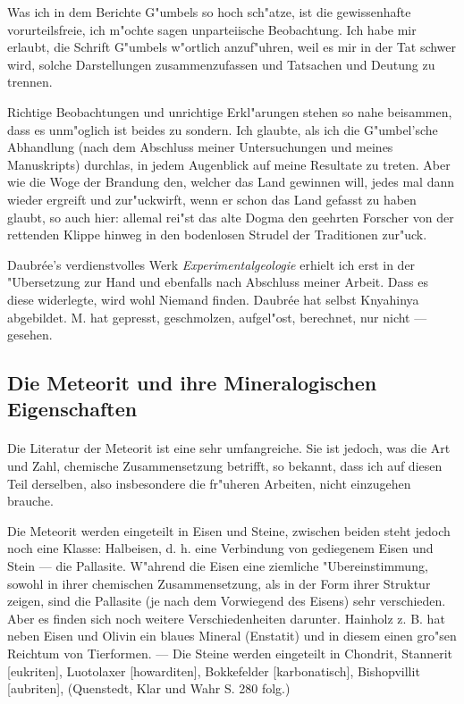\documentclass[a4paper, 11pt, oneside]{article}
\begin{document}
Was ich in dem Berichte G"umbels so hoch sch"atze, ist die gewissenhafte vorurteilsfreie, ich m"ochte sagen unparteiische Beobachtung. Ich habe mir erlaubt, die Schrift G"umbels w"ortlich anzuf"uhren, weil es mir in der Tat schwer wird, solche Darstellungen zusammenzufassen und Tatsachen und Deutung zu trennen.

Richtige Beobachtungen und unrichtige Erkl"arungen stehen so nahe beisammen, dass es unm"oglich ist beides zu sondern. Ich glaubte, als ich die G"umbel'sche Abhandlung (nach dem Abschluss meiner Untersuchungen und meines Manuskripts) durchlas, in jedem Augenblick auf meine Resultate zu treten. Aber wie die Woge der Brandung den, welcher das Land gewinnen will, jedes mal dann wieder ergreift und zur"uckwirft, wenn er schon das Land gefasst zu haben glaubt, so auch hier: allemal rei"st das alte Dogma den geehrten Forscher von der rettenden Klippe hinweg in den bodenlosen Strudel der Traditionen zur"uck.

Daubrée's verdienstvolles Werk \emph{Experimentalgeologie} erhielt ich erst in der "Ubersetzung zur Hand und ebenfalls nach Abschluss meiner Arbeit. Dass es diese widerlegte, wird wohl Niemand finden. Daubrée hat selbst Knyahinya abgebildet. M. hat gepresst, geschmolzen, aufgel"ost, berechnet, nur nicht --- gesehen.
\clearpage
\subsection{Die Meteorit und ihre Mineralogischen Eigenschaften}
\paragraph{}
Die Literatur der Meteorit ist eine sehr umfangreiche. Sie ist jedoch, was die Art und Zahl, chemische Zusammensetzung betrifft, so bekannt, dass ich auf diesen Teil derselben, also insbesondere die fr"uheren Arbeiten, nicht einzugehen brauche.

Die Meteorit werden eingeteilt in Eisen und Steine, zwischen beiden steht jedoch noch eine Klasse: Halbeisen, d. h. eine Verbindung von gediegenem Eisen und Stein --- die Pallasite. W"ahrend die Eisen eine ziemliche "Ubereinstimmung, sowohl in ihrer chemischen Zusammensetzung, als in der Form ihrer Struktur zeigen, sind die Pallasite (je nach dem Vorwiegend des Eisens) sehr verschieden. Aber es finden sich noch weitere Verschiedenheiten darunter. Hainholz z. B. hat neben Eisen und Olivin ein blaues Mineral (Enstatit) und in diesem einen gro"sen Reichtum von Tierformen. --- Die Steine werden eingeteilt in Chondrit, Stannerit [eukriten], Luotolaxer [howarditen], Bokkefelder [karbonatisch], Bishopvillit [aubriten], (Quenstedt, Klar und Wahr S. 280 folg.)
\end{document}
